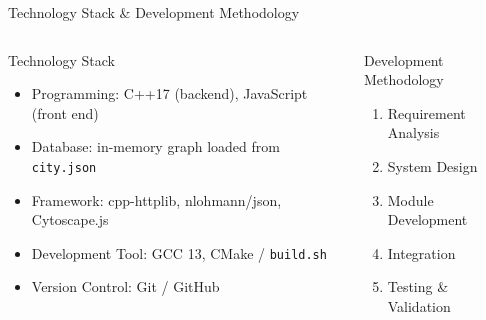 \documentclass[aspectratio=169,11pt]{beamer}
\begin{document}
\begin{frame}{Technology Stack \& Development Methodology}
\small

\begin{columns}[T,totalwidth=\textwidth]


\begin{block}{Technology Stack}

\begin{itemize}\itemsep2pt
\item Programming: C++17 (backend), JavaScript (front end)
\item Database: in-memory graph loaded from \texttt{city.json}
\item Framework: cpp-httplib, nlohmann/json, Cytoscape.js
\item Development Tool: GCC 13, CMake / \texttt{build.sh}
\item Version Control: Git / GitHub
\end{itemize}

\end{block}


\begin{block}{Development Methodology}

\begin{enumerate}\itemsep2pt
\item Requirement Analysis
\item System Design
\item Module Development
\item Integration
\item Testing \& Validation
\end{enumerate}

\end{block}

\end{columns}

\end{frame}
\end{document}
